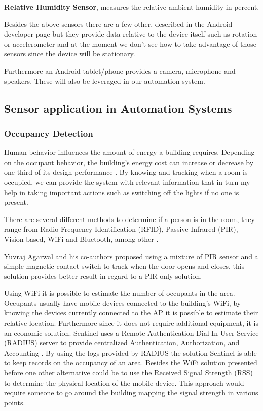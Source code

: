 \textbf{Relative Humidity Sensor}, measures the relative ambient humidity in percent.

Besides the above sensors there are a few other, described in the Android developer page\cite{android:sensors} but they provide data relative to the device itself such as rotation or accelerometer and at the moment we don't see how to take advantage of those sensors since the device will be stationary.

Furthermore an Android tablet/phone provides a camera, microphone and speakers. These will also be leveraged in our automation system.



\subsection{Sensor application in Automation Systems}

\subsubsection{Occupancy Detection}\label{ocupacy_detection}

Human behavior influences the amount of energy a building requires. Depending on the occupant behavior, the building's energy cost can increase or decrease by one-third of its design performance \cite{ocupancy2}. 
By knowing and tracking when a room is occupied, we can provide the system with relevant information that in turn my help in taking important actions such as switching off the lights if no one is present. 

There are several different methods to determine if a person is in the room, they range from Radio Frequency Identification (RFID), Passive Infrared (PIR), Vision-based, \ac{WiFi} and Bluetooth, among other \cite{ocupancy3}.

Yuvraj Agarwal and his co-authors proposed using a mixture of PIR sensor and a simple magnetic contact switch to track when the door opens and closes, this solution provides better result in regard to a PIR only solution\cite{ocupancy1}.

Using \ac{WiFi} it is possible to estimate the number of occupants in the area. Occupants usually have mobile devices connected to the building's \ac{WiFi}, by knowing the devices currently connected to the AP it is possible to estimate their relative location. Furthermore since it does not require additional equipment, it is an economic solution.
Sentinel uses a Remote Authentication Dial In User Service (RADIUS) server to provide centralized Authentication, Authorization, and Accounting \cite{wifi_ocupancy}. By using the logs provided by RADIUS the solution Sentinel is able to keep records on the occupancy of an area. 
Besides the \ac{WiFi} solution presented before one other alternative could be to use the Received Signal Strength (RSS) to determine the physical location of the mobile device\cite{wifi_ocupancy2}. This approach would require someone to go around the building mapping the signal strength in various points.

